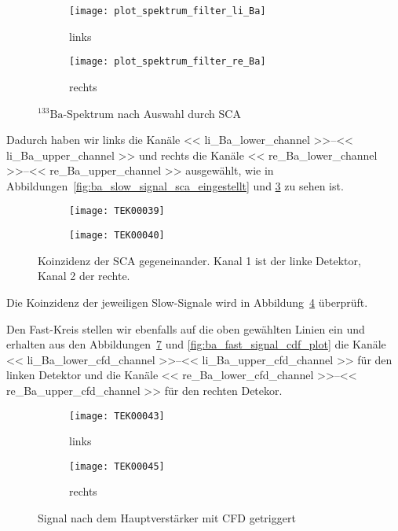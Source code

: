 \documentclass[11pt, ngerman, fleqn, DIV=15, headinclude, BCOR=2cm]{scrreprt}
\begin{document}
\begin{figure}
	\centering
	\begin{subfigure}{0.49 \textwidth}
		\texttt{[image: plot\_spektrum\_filter\_li\_Ba]}
		\caption{%
			links
		}
		\label{fig:ba_slow_sca_eingestellt-li_plot}
	\end{subfigure}
	\begin{subfigure}{0.49 \textwidth}
		\texttt{[image: plot\_spektrum\_filter\_re\_Ba]}
		\caption{%
			rechts
		}
		\label{fig:ba_slow_sca_eingestellt-re_plot}
	\end{subfigure}
	\caption{%
		$^{133}\text{Ba}$-Spektrum nach Auswahl durch SCA
	}
	\label{fig:ba_slow_signal_sca_eingestellt_plot}
\end{figure}

Dadurch haben wir links die Kanäle
\numrange{<< li_Ba_lower_channel >>}{<< li_Ba_upper_channel >>} und rechts
die Kanäle
\numrange{<< re_Ba_lower_channel >>}{<< re_Ba_upper_channel >>} ausgewählt, wie
in Abbildungen~\ref{fig:ba_slow_signal_sca_eingestellt} und
\ref{fig:ba_slow_signal_sca_eingestellt_plot} zu sehen ist.


\begin{figure}
	\centering
	\begin{subfigure}{0.49 \textwidth}
		\texttt{[image: TEK00039]}
	\end{subfigure}
	\begin{subfigure}{0.49 \textwidth}
		\texttt{[image: TEK00040]}
	\end{subfigure}
	\caption{%
		Koinzidenz der SCA gegeneinander. Kanal 1 ist der linke
		Detektor, Kanal 2 der rechte.
	}
	\label{fig:ba_slow_signal_sca_koinzidenz}
\end{figure}

Die Koinzidenz der jeweiligen Slow-Signale wird in
Abbildung~\ref{fig:ba_slow_signal_sca_koinzidenz} überprüft.

Den Fast-Kreis stellen wir ebenfalls auf die oben gewählten Linien ein und
erhalten aus den Abbildungen~\ref{fig:ba_fast_signal_cfd_trig} und
\ref{fig:ba_fast_signal_cdf_plot} die Kanäle
\numrange{<< li_Ba_lower_cfd_channel >>}{<< li_Ba_upper_cfd_channel >>} für den
linken Detektor und
die Kanäle
\numrange{<< re_Ba_lower_cfd_channel >>}{<< re_Ba_upper_cfd_channel >>} für den
rechten Detekor.


\begin{figure}
	\centering
	\begin{subfigure}{0.49 \textwidth}
		\texttt{[image: TEK00043]}
		\caption{%
			links
		}
		\label{fig:ba_fast_signal_cfd_trig-li}
	\end{subfigure}
	\begin{subfigure}{0.49 \textwidth}
		\texttt{[image: TEK00045]}
		\caption{%
			rechts
		}
		\label{fig:ba_fast_signal_cfd_trig-re}
	\end{subfigure}
	\caption{%
		Signal nach dem Hauptverstärker mit CFD getriggert
	}
	\label{fig:ba_fast_signal_cfd_trig}
\end{figure}
\end{document}
